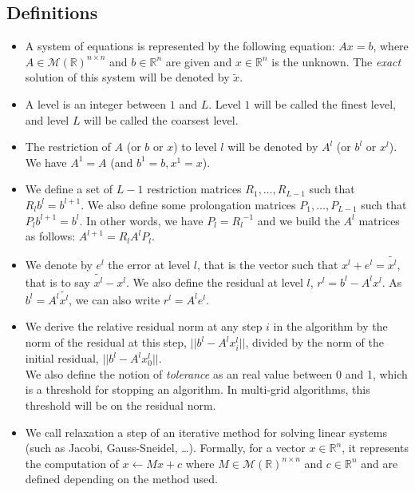 \documentclass[sigplan]{acmart}
\begin{document}
\subsection{Definitions}

\begin{itemize}
 \item A system of equations is represented by the following equation: $Ax=b$, where $A \in \mathcal{M}(\mathbb{R})^{n\times n}$ and $b \in \mathcal{\mathbb{R}}^n$ are given and
 $x \in \mathbb{R}^n$ is the unknown. The \emph{exact} solution of this system will be denoted by $\widetilde{x}$.
 \item A level is an integer between $1$ and $L$. Level $1$ will be called the finest level, and level $L$ will be called the coarsest level.
 \item The restriction of $A$ (or $b$ or $x$) to level $l$ will be denoted by $A^l$ (or $b^l$ or $x^l$). We have $A^1 = A$ (and $b^1=b,x^1=x$).
 \item We define a set of $L-1$ restriction matrices $R_1,\dots,R_{L-1}$ such that $R_l b^l = b^{l+1}$. We also define some prolongation matrices $P_1,\dots,P_{L-1}$ such that $P_{l}b^{l+1} = b^l$.
 In other words, we have $P_l = {R_l}^{-1}$ and we build the $A^l$ matrices as follows: $A^{l+1} = R_l A^l P_l$.
 \item We denote by $e^l$ the error at level $l$, that is the vector such that $x^l + e^l = \widetilde{x^l}$, that is to say $\widetilde{x^l}-x^l$.
 We also define the residual at level $l$, $r^l = b^l - A^lx^l$. As $b^l = A^l\widetilde{x^l}$, we can also write $r^l = A^le^l$.
 \item We derive the relative residual norm at any step $i$ in the algorithm
 by the norm of the residual at this step, $||b^l - A^lx^l_i||$, divided by the norm of the initial residual, $|| b^l - A^lx^l_0||$.\\ We also define the notion of \emph{tolerance}
 as an real value between 0 and 1, which is a threshold for stopping an algorithm. In multi-grid algorithms, this threshold will be on the residual norm.
 \item We call relaxation a step of an iterative method for solving linear systems (such as Jacobi, Gauss-Sneidel, \dots). Formally, for a vector $x \in \mathbb{R}^n$, it represents the computation of
 $x \leftarrow Mx + c$ where $M \in \mathcal{M}(\mathbb{R})^{n\times n}$ and $c \in \mathcal{\mathbb{R}}^n$ and are defined depending on the method used.
\end{itemize}
\end{document}
